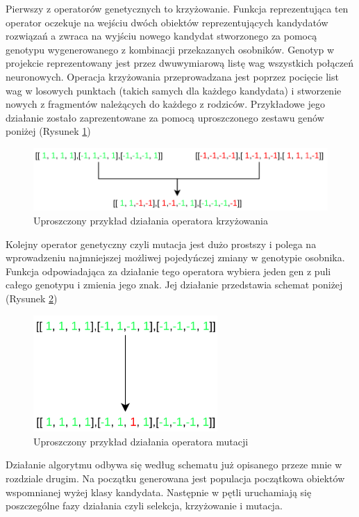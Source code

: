 \documentclass[12pt, oneside, a4paper]{report}
\begin{document}
Pierwszy z operatorów genetycznych to krzyżowanie. Funkcja reprezentująca ten operator oczekuje na wejściu dwóch obiektów reprezentujących kandydatów rozwiązań a zwraca na wyjściu nowego kandydat stworzonego za pomocą genotypu wygenerowanego z kombinacji przekazanych osobników. Genotyp w projekcie reprezentowany jest przez dwuwymiarową listę wag wszystkich połączeń neuronowych. Operacja krzyżowania przeprowadzana jest poprzez pocięcie list wag w losowych punktach (takich samych dla każdego kandydata) i stworzenie nowych z fragmentów należących do każdego z rodziców. Przykładowe jego działanie zostało zaprezentowane za pomocą uproszczonego zestawu genów poniżej (Rysunek \ref{fig: 4.3.crossing})

\begin{figure}[h]
	\centering
	\includegraphics[width=14cm]{fig431.png}
	\caption{Uproszczony przykład działania operatora krzyżowania}
	\label{fig: 4.3.crossing}
\end{figure}
\newpage

Kolejny operator genetyczny czyli mutacja jest dużo prostszy i polega na wprowadzeniu najmniejszej możliwej pojedyńczej zmiany w genotypie osobnika. Funkcja odpowiadająca za działanie tego operatora wybiera jeden gen z puli całego genotypu i zmienia jego znak. Jej działanie przedstawia schemat poniżej (Rysunek \ref{fig: 4.3.mutation})

\begin{figure}[h]
	\centering
	\includegraphics[width=7cm]{fig432.png}
	\caption{Uproszczony przykład działania operatora mutacji}
	\label{fig: 4.3.mutation}
\end{figure}

Działanie algorytmu odbywa się według schematu już opisanego przeze mnie w rozdziale drugim. Na początku generowana jest populacja początkowa obiektów wspomnianej wyżej klasy kandydata. Następnie w pętli uruchamiają się poszczególne fazy działania czyli selekcja, krzyżowanie i mutacja.
\end{document}
